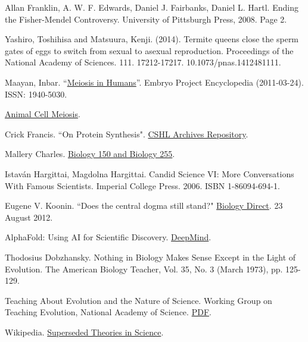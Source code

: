 \documentclass[12pt]{article}
\begin{document}
\begin{thebibliography}{00}
     Allan Franklin, A. W. F. Edwards, Daniel J. Fairbanks, Daniel L. Hartl. Ending the Fisher-Mendel Controversy. University of Pittsburgh Press, 2008. Page 2.

     Yashiro, Toshihisa and Matsuura, Kenji. (2014). Termite queens close the sperm gates of eggs to switch from sexual to asexual reproduction. Proceedings of the National Academy of Sciences. 111. 17212-17217. 10.1073/pnas.1412481111. 

     Maayan, Inbar. ``\href{http://embryo.asu.edu/handle/10776/2084}{Meiosis in Humans}''. Embryo Project Encyclopedia (2011-03-24). ISSN: 1940-5030. 

     \href{https://www.cellsalive.com/meiosis_js.htm}{Animal Cell Meiosis}.

     Crick Francis. ``On Protein Synthesis". \href{https://libgallery.cshl.edu}{CSHL Archives Repository}.

     Mallery Charles. \href{http://henge.bio.miami.edu/mallery/150/}{Biology 150 and Biology 255}.
        
     Istav{\'a}n Hargittai, Magdolna Hargittai. Candid Science VI: More Conversations With Famous Scientists. Imperial College Press. 2006. ISBN 1-86094-694-1.

     Eugene V. Koonin. ``Does the central dogma still stand?" \href{https://biologydirect.biomedcentral.com/articles/10.1186/1745-6150-7-27}{Biology Direct}. 23 August 2012. 
        
     AlphaFold: Using AI for Scientific Discovery. \href{https://deepmind.com/blog/article/AlphaFold-Using-AI-for-scientific-discovery}{DeepMind}.

     Thodosius Dobzhansky. Nothing in Biology Makes Sense Except in the Light of Evolution. The American Biology Teacher, Vol. 35, No. 3 (March 1973), pp. 125-129.
        
     Teaching About Evolution and the Nature of Science. Working Group on Teaching Evolution, National Academy of Science. \href{http://nap.edu/5787}{PDF}.

     Wikipedia. \href{https://en.wikipedia.org/wiki/Superseded_theories_in_science}{Superseded Theories in Science}.
\end{thebibliography}
\end{document}
